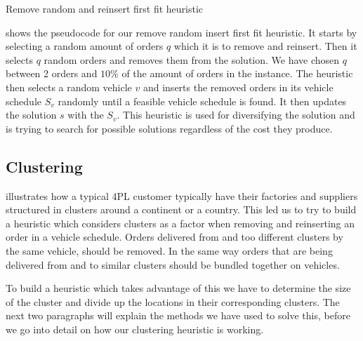 \documentclass[../main.tex]{subfiles}
\begin{document}
\begin{algorithm}
    \caption{Remove random and reinsert first fit heuristic}\label{alg:rand}
    \begin{algorithmic}[1]
        $}
        \State select the number of orders to reinsert, $q$
        \State solution $s' = s$
        \State remove $q$ orders from $s'$
        \State set I = removed orders
        \For{$z\in I$}
            \Repeat
            \State choose random vehicle $v$
            \State choose random position in vehicle schedule $S_v$
            \State insert $z$ in $S_v$
            \Until {feasible vehicle schedule found}
            \State update s'
        \EndFor
        \State
        \Return s'
        \EndFunction
    \end{algorithmic}
\end{algorithm}

 shows the pseudocode for our remove random insert first fit heuristic. 
It starts by selecting a random amount of orders $q$ which it is to remove and reinsert. 
Then it selects $q$ random orders and removes them from the solution. 
We have chosen $q$ between 2 orders and $10\%$ of the amount of orders in the instance.
The heuristic then selects a random vehicle $v$ and inserts the removed orders in its vehicle schedule $S_v$ randomly until a feasible vehicle schedule is found.
It then updates the solution $s$ with the $S_v$.
This heuristic is used for diversifying the solution and is trying to search for possible solutions regardless of the cost they produce.

\subsection{Clustering}
\label{sec:clust}
 illustrates how a typical 4PL customer typically have their factories and suppliers structured in clusters around a continent or a country. 
This led us to try to build a heuristic which considers clusters as a factor when removing and reinserting an order in a vehicle schedule. 
Orders delivered from and too different clusters by the same vehicle, should be removed. 
In the same way orders that are being delivered from and to similar clusters should be bundled together on vehicles. \par
To build a heuristic which takes advantage of this we have to determine the size of the cluster and divide up the locations in their corresponding clusters.
The next two paragraphs will explain the methods we have used to solve this, before we go into detail on how our clustering heuristic is working.
\end{document}
